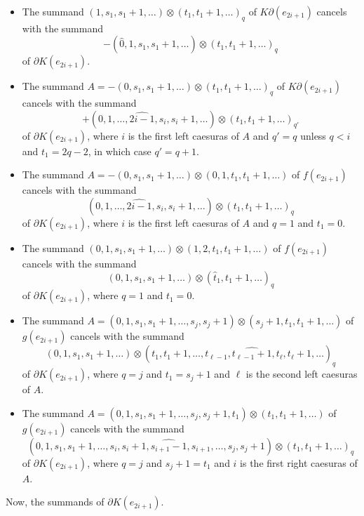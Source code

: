 \begin{itemize}
\item The summand $(1,s_1,s_1+1,\ldots)\otimes(t_1,t_1+1,\ldots)_q$ of $K\partial(e_{2i+1})$ cancels with the summand
\[-(\widehat{0},1,s_1,s_1+1,\ldots)\otimes (t_1,t_1+1,\ldots)_q\]
of $\partial K(e_{2i+1})$.
\item The summand $A = -(0,s_1,s_1+1,\ldots)\otimes(t_1,t_1+1,\ldots)_q$ of $K\partial(e_{2i+1})$ cancels with the summand
\[+(0,1,\ldots,\widehat{2i-1},s_i,s_i+1,\ldots)\otimes (t_1,t_1+1,\ldots)_{q'}\]
of $\partial K(e_{2i+1})$, where $i$ is the first left caesuras of $A$ and $q'=q$ unless $q<i$ and $t_1=2q-2$, in which case $q'=q+1$.
\item The summand $A = -(0,s_1,s_1+1,\ldots)\otimes (0,1,t_1,t_1+1,\ldots)$ of $f(e_{2i+1})$ cancels with the summand
\[(0,1,\ldots,\widehat{2i-1},s_i,s_i+1,\ldots)\otimes (t_1,t_1+1,\ldots)_q\]
of $\partial K(e_{2i+1})$, where $i$ is the first left caesuras of $A$ and $q=1$ and $t_1=0$.
\item The summand $(0,1,s_1,s_1+1,\ldots)\otimes (1,2,t_1,t_1+1,\ldots)$ of $f(e_{2i+1})$ cancels with the summand
\[(0,1,s_1,s_1+1,\ldots)\otimes (\widehat{t}_1,t_1+1,\ldots)_q\]
of $\partial K(e_{2i+1})$, where $q=1$ and $t_1=0$.
\item The summand $A = (0,1,s_1,s_1+1,\ldots,s_j,s_j+1)\otimes(s_j+1,t_1,t_1+1,\ldots)$ of $g(e_{2i+1})$ cancels with the summand
\[(0,1,s_1,s_1+1,\ldots)\otimes (t_1,t_1+1,\ldots,t_{\ell-1},\widehat{t_{\ell-1}+1},t_\ell,t_\ell+1,\ldots)_q\]
of $\partial K(e_{2i+1})$, where $q=j$ and $t_1=s_j+1$ and $\ell$ is the second left caesuras of $A$. 
\item The summand $A = (0,1,s_1,s_1+1,\ldots,s_j,s_j+1,t_1)\otimes(t_1,t_1+1,\ldots)$ of $g(e_{2i+1})$ cancels with the summand
\[(0,1,s_1,s_1+1,\ldots,s_i,s_i+1,\widehat{s_{i+1}-1},s_{i+1},\ldots,s_j,s_j+1)\otimes (t_1,t_1+1,\ldots)_q\]
of $\partial K(e_{2i+1})$, where $q=j$ and $s_j+1=t_1$ and $i$ is the first right caesuras of $A$.
\end{itemize}
Now, the summands of $\partial K(e_{2i+1})$.
